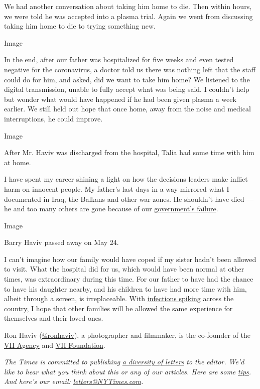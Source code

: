We had another conversation about taking him home to die. Then within
hours, we were told he was accepted into a plasma trial. Again we went
from discussing taking him home to die to trying something new.

Image

In the end, after our father was hospitalized for five weeks and even
tested negative for the coronavirus, a doctor told us there was nothing
left that the staff could do for him, and asked, did we want to take him
home? We listened to the digital transmission, unable to fully accept
what was being said. I couldn't help but wonder what would have happened
if he had been given plasma a week earlier. We still held out hope that
once home, away from the noise and medical interruptions, he could
improve.

Image

After Mr. Haviv was discharged from the hospital, Talia had some time
with him at home.

I have spent my career shining a light on how the decisions leaders make
inflict harm on innocent people. My father's last days in a way mirrored
what I documented in Iraq, the Balkans and other war zones. He shouldn't
have died --- he and too many others are gone because of our
\href{https://www.nytimes3xbfgragh.onion/2020/04/11/us/politics/coronavirus-trump-response.html}{government's
failure}.

Image

Barry Haviv passed away on May 24.

I can't imagine how our family would have coped if my sister hadn't been
allowed to visit. What the hospital did for us, which would have been
normal at other times, was extraordinary during this time. For our
father to have had the chance to have his daughter nearby, and his
children to have had more time with him, albeit through a screen, is
irreplaceable. With
\href{https://www.nytimes3xbfgragh.onion/interactive/2020/us/coronavirus-us-cases.html?action=click\&module=Top\%20Stories\&pgtype=Homepage}{infections
spiking} across the country, I hope that other families will be allowed
the same experience for themselves and their loved ones.

Ron Haviv (\href{https://twitter.com/ronhaviv?lang=en}{@ronhaviv}), a
photographer and filmmaker, is the co-founder of the
\href{https://viiphoto.com/}{VII Agency} and
\href{https://theviifoundation.org/}{VII Foundation}.

\emph{The Times is committed to publishing}
\href{https://www.nytimes3xbfgragh.onion/2019/01/31/opinion/letters/letters-to-editor-new-york-times-women.html}{\emph{a
diversity of letters}} \emph{to the editor. We'd like to hear what you
think about this or any of our articles. Here are some}
\href{https://help.nytimes3xbfgragh.onion/hc/en-us/articles/115014925288-How-to-submit-a-letter-to-the-editor}{\emph{tips}}\emph{.
And here's our email:}
\href{mailto:letters@NYTimes.com}{\emph{letters@NYTimes.com}}\emph{.}

